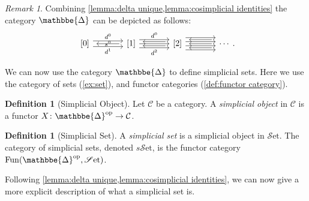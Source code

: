 \documentclass[11pt, a4paper]{amsart}
\def\DDelta{{\mathbbe{\Delta}}}
\newcommand{\DD}{\DDelta}
\newcommand{\cC}{\mathcal{C}}
\newcommand{\op}{\mathrm{op}}
\newcommand{\Fun}{\mathrm{Fun}}
\newcommand{\Set}{\mathscr{S}\mathrm{et}}
\newcommand{\sSet}{s\mathscr{S}\mathrm{et}}
\theoremstyle{definition}
\newtheorem{definition}[equation]{Definition}
\theoremstyle{remark}
\newtheorem{remark}[equation]{Remark}
\numberwithin{equation}{section}
\begin{document}
\begin{remark} \label{rem:delta}
  Combining \cref{lemma:delta unique,lemma:cosimplicial identities} the category $\DD$ can be depicted as follows:
\[
    \begin{tikzcd}[row sep=0.5in, column sep=0.5in]
      [0]
      \arrow[r, shift left=1.4, "d^0"] 
      \arrow[r, shift right=1.4, "d^1"'] 
      & 
      {[1]}
      \arrow[l, shorten >=1ex,shorten <=1ex, "s^0" yshift= .2cm]
      \arrow[r] \arrow[r, shift left=2, "d^0"] \arrow[r, shift right=2, "d^2"']   
      & {[2]}
      \arrow[l, shift right, shorten >=1ex,shorten <=1ex ] 
      \arrow[l, shift left, shorten >=1ex,shorten <=1ex] 
      \arrow[r, shift right=1] \arrow[r, shift left=1] \arrow[r, shift right=3] \arrow[r, shift left=3] 
      & 
      \cdots 
      \arrow[l, shorten >=1ex,shorten <=1ex] \arrow[l, shift left=2, shorten >=1ex,shorten <=1ex] 
      \arrow[l, shift right=2, shorten >=1ex,shorten <=1ex]
    \end{tikzcd}.
  \]
\end{remark}

We can now use the category $\DD$ to define simplicial sets. Here we use the category of sets (\cref{ex:set}), and functor categories (\cref{def:functor category}).

\begin{definition}[Simplicial Object]
  Let $\cC$ be a category. A \emph{simplicial object} in $\cC$ is a functor $X\colon \DD^{\op} \to \cC$. 
\end{definition}

\begin{definition}[Simplicial Set] \label{def:sset}
  A \emph{simplicial set} is a simplicial object in $\Set$. The category of simplicial sets, denoted $\sSet$, is the functor category $\Fun(\DD^{\op},\Set)$.
\end{definition}

Following \cref{lemma:delta unique,lemma:cosimplicial identities}, we can now give a more explicit description of what a simplicial set is.
\end{document}
